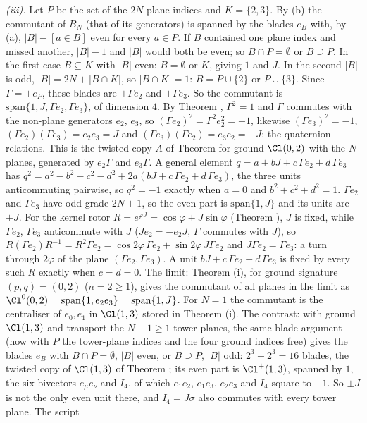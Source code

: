 \emph{(iii).} Let $P$ be the set of the $2N$ plane indices and $K = \{2, 3\}$. By (b) the commutant of $B_{N}$ (that of its generators) is spanned by the blades $e_{B}$ with, by (a), $|B| - [a \in B]$ even for every $a \in P$. If $B$ contained one plane index and missed another, $|B| - 1$ and $|B|$ would both be even; so $B \cap P = \emptyset$ or $B \supseteq P$. In the first case $B \subseteq K$ with $|B|$ even: $B = \emptyset$ or $K$, giving $1$ and $J$. In the second $|B|$ is odd, $|B| = 2N + |B \cap K|$, so $|B \cap K| = 1$: $B = P \cup \{2\}$ or $P \cup \{3\}$. Since $\Gamma = \pm e_{P}$, these blades are $\pm\Gamma e_{2}$ and $\pm\Gamma e_{3}$. So the commutant is $\mathrm{span}\{1, J, \Gamma e_{2}, \Gamma e_{3}\}$, of dimension $4$. By Theorem , $\Gamma^{2} = 1$ and $\Gamma$ commutes with the non-plane generators $e_{2}$, $e_{3}$, so $(\Gamma e_{2})^{2} = \Gamma^{2}e_{2}^{2} = -1$, likewise $(\Gamma e_{3})^{2} = -1$, $(\Gamma e_{2})(\Gamma e_{3}) = e_{2}e_{3} = J$ and $(\Gamma e_{3})(\Gamma e_{2}) = e_{3}e_{2} = -J$: the quaternion relations. This is the twisted copy $A$ of Theorem  for ground $\Cl(0,2)$ with the $N$ planes, generated by $e_{2}\Gamma$ and $e_{3}\Gamma$. A general element $q = a + bJ + c\,\Gamma e_{2} + d\,\Gamma e_{3}$ has $q^{2} = a^{2} - b^{2} - c^{2} - d^{2} + 2a(bJ + c\,\Gamma e_{2} + d\,\Gamma e_{3})$, the three units anticommuting pairwise, so $q^{2} = -1$ exactly when $a = 0$ and $b^{2} + c^{2} + d^{2} = 1$. $\Gamma e_{2}$ and $\Gamma e_{3}$ have odd grade $2N + 1$, so the even part is $\mathrm{span}\{1, J\}$ and its units are $\pm J$. For the kernel rotor $R = e^{\varphi J} = \cos\varphi + J\sin\varphi$ (Theorem ), $J$ is fixed, while $\Gamma e_{2}$, $\Gamma e_{3}$ anticommute with $J$ ($Je_{2} = -e_{2}J$, $\Gamma$ commutes with $J$), so $R(\Gamma e_{2})R^{-1} = R^{2}\Gamma e_{2} = \cos 2\varphi\,\Gamma e_{2} + \sin 2\varphi\,J\Gamma e_{2}$ and $J\Gamma e_{2} = \Gamma e_{3}$: a turn through $2\varphi$ of the plane $(\Gamma e_{2}, \Gamma e_{3})$. A unit $bJ + c\,\Gamma e_{2} + d\,\Gamma e_{3}$ is fixed by every such $R$ exactly when $c = d = 0$. The limit: Theorem (i), for ground signature $(p, q) = (0, 2)$ ($n = 2 \ge 1$), gives the commutant of all planes in the limit as $\Cl^{0}(0,2) = \mathrm{span}\{1, e_{2}e_{3}\} = \mathrm{span}\{1, J\}$. For $N = 1$ the commutant is the centraliser of $e_{0}, e_{1}$ in $\Cl(1,3)$ stored in Theorem (i). The contrast: with ground $\Cl(1,3)$ and transport the $N - 1 \ge 1$ tower planes, the same blade argument (now with $P$ the tower-plane indices and the four ground indices free) gives the blades $e_{B}$ with $B \cap P = \emptyset$, $|B|$ even, or $B \supseteq P$, $|B|$ odd: $2^{3} + 2^{3} = 16$ blades, the twisted copy of $\Cl(1,3)$ of Theorem ; its even part is $\Cl^{+}(1,3)$, spanned by $1$, the six bivectors $e_{\mu}e_{\nu}$ and $I_{4}$, of which $e_{1}e_{2}$, $e_{1}e_{3}$, $e_{2}e_{3}$ and $I_{4}$ square to $-1$. So $\pm J$ is not the only even unit there, and $I_{4} = J\sigma$ also commutes with every tower plane. The script 